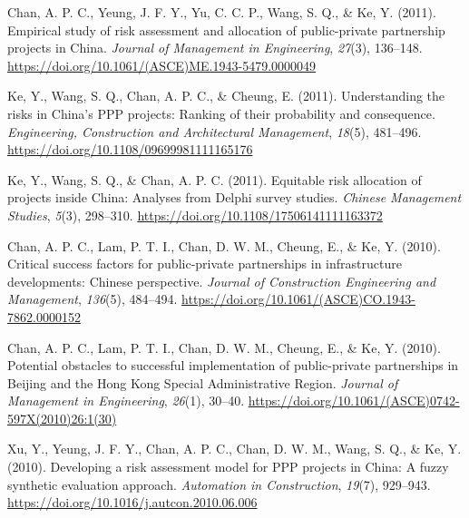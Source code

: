 \documentclass[11pt,a4paper]{report} %
\begin{document}
\begin{tablist}
        \item[2011] \tab{}Chan, A. P. C., Yeung, J. F. Y., Yu, C. C. P., Wang, S. Q., \& Ke, Y. (2011). Empirical study of risk assessment and allocation of public-private partnership projects in China. \textit{Journal of Management in Engineering}, \textit{27}(3), 136--148. \href{https://doi.org/10.1061/(ASCE)ME.1943-5479.0000049}{https://doi.org/10.1061/(ASCE)ME.1943-5479.0000049}
        
        \item[2011] \tab{}Ke, Y., Wang, S. Q., Chan, A. P. C., \& Cheung, E. (2011). Understanding the risks in China's PPP projects: Ranking of their probability and consequence. \textit{Engineering, Construction and Architectural Management}, \textit{18}(5), 481--496. \href{https://doi.org/10.1108/09699981111165176}{https://doi.org/10.1108/09699981111165176}
        
        \item[2011] \tab{}Ke, Y., Wang, S. Q., \& Chan, A. P. C. (2011). Equitable risk allocation of projects inside China: Analyses from Delphi survey studies. \textit{Chinese Management Studies}, \textit{5}(3), 298--310. \href{https://doi.org/10.1108/17506141111163372}{https://doi.org/10.1108/17506141111163372}
        
        \item[2010] \tab{}Chan, A. P. C., Lam, P. T. I., Chan, D. W. M., Cheung, E., \& Ke, Y. (2010). Critical success factors for public-private partnerships in infrastructure developments: Chinese perspective. \textit{Journal of Construction Engineering and Management}, \textit{136}(5), 484--494. \href{https://doi.org/10.1061/(ASCE)CO.1943-7862.0000152}{https://doi.org/10.1061/(ASCE)CO.1943-7862.0000152}
        
        \item[2010] \tab{}Chan, A. P. C., Lam, P. T. I., Chan, D. W. M., Cheung, E., \& Ke, Y. (2010). Potential obstacles to successful implementation of public-private partnerships in Beijing and the Hong Kong Special Administrative Region. \textit{Journal of Management in Engineering}, \textit{26}(1), 30--40. \href{https://doi.org/10.1061/(ASCE)0742-597X(2010)26:1(30)}{https://doi.org/10.1061/(ASCE)0742-597X(2010)26:1(30)}
        
        \item[2010] \tab{}Xu, Y., Yeung, J. F. Y., Chan, A. P. C., Chan, D. W. M., Wang, S. Q., \& Ke, Y. (2010). Developing a risk assessment model for PPP projects in China: A fuzzy synthetic evaluation approach. \textit{Automation in Construction}, \textit{19}(7), 929--943. \href{https://doi.org/10.1016/j.autcon.2010.06.006}{https://doi.org/10.1016/j.autcon.2010.06.006}
        

\end{tablist}
\end{document}
